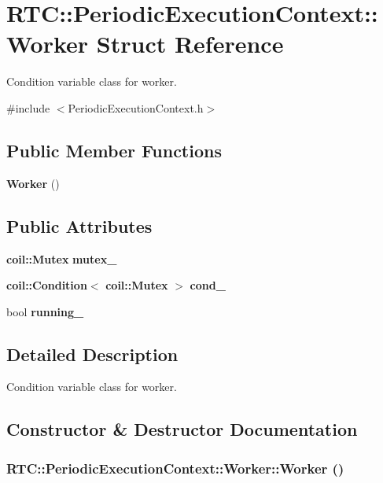 \section{RTC::PeriodicExecutionContext::Worker Struct Reference}
\label{structRTC_1_1PeriodicExecutionContext_1_1Worker}


Condition variable class for worker.  




{\ttfamily \#include $<$PeriodicExecutionContext.h$>$}

\subsection*{Public Member Functions}
\begin{DoxyCompactItemize}
\item 
{\bf Worker} ()
\end{DoxyCompactItemize}
\subsection*{Public Attributes}
\begin{DoxyCompactItemize}
\item 
{\bf coil::Mutex} {\bf mutex\_\-}
\item 
{\bf coil::Condition}$<$ {\bf coil::Mutex} $>$ {\bf cond\_\-}
\item 
bool {\bf running\_\-}
\end{DoxyCompactItemize}


\subsection{Detailed Description}
Condition variable class for worker. 

\subsection{Constructor \& Destructor Documentation}
\subsubsection[{Worker}]{\setlength{\rightskip}{0pt plus 5cm}RTC::PeriodicExecutionContext::Worker::Worker ()\hspace{0.3cm}{\ttfamily  [inline]}}\label{structRTC_1_1PeriodicExecutionContext_1_1Worker_aac0bb41d90af7824afefa8c8e44d99a6}


